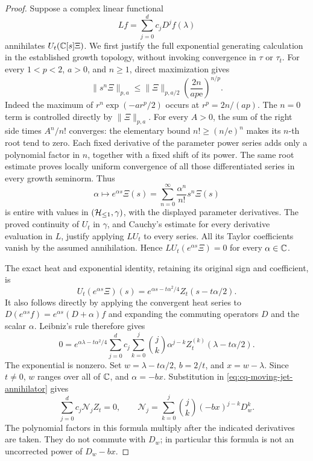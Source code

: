 \begin{proof}
Suppose a complex linear functional
\[
 Lf=\sum_{j=0}^d c_jD^jf(\lambda)
\]
annihilates $U_t(\mathbb C[s]\Xi)$. We first justify the full
exponential generating calculation in the established growth
topology, without invoking convergence in $\tau$ or $\tau_t$.
For every $1<p<2$, $a>0$, and $n\ge1$, direct maximization gives
\begin{equation}
 \|s^n\Xi\|_{p,a}
 \le\|\Xi\|_{p,a/2}
       \left(\frac{2n}{ap\mathrm e}\right)^{n/p}.
 \label{eq:cq-exponential-jet-convergence}
\end{equation}
Indeed the maximum of $r^n\exp(-ar^p/2)$ occurs at
$r^p=2n/(ap)$. The $n=0$ term is controlled directly by
$\|\Xi\|_{p,a}$. For every $A>0$, the sum of the right side
times $A^n/n!$ converges: the elementary bound
$n!\ge(n/\mathrm e)^n$ makes its $n$-th root tend to zero.
Each fixed derivative of the parameter power series adds only
a polynomial factor in $n$, together with a fixed shift of its
power. The same root estimate proves locally uniform convergence
of all those differentiated series in every growth seminorm.
Thus
\[
 \alpha\longmapsto e^{\alpha s}\Xi(s)
   =\sum_{n=0}^\infty\frac{\alpha^n}{n!}s^n\Xi(s)
\]
is entire with values in $(\mathcal H_{\leq 1},\gamma)$, with the displayed
parameter derivatives. The proved continuity of $U_t$ in
$\gamma$, and Cauchy's estimate for every derivative evaluation
in $L$, justify applying $LU_t$ to every series. All its Taylor
coefficients vanish by the assumed annihilation. Hence
$LU_t(e^{\alpha s}\Xi)=0$ for every $\alpha\in\mathbb C$.

The exact heat and exponential identity, retaining its original
sign and coefficient, is
\[
 U_t(e^{\alpha s}\Xi)(s)
  =e^{\alpha s-t\alpha^2/4}Z_t(s-t\alpha/2).
\]
It also follows directly by applying the convergent heat series
to $D(e^{\alpha s}f)=e^{\alpha s}(D+\alpha)f$ and expanding
the commuting operators $D$ and the scalar $\alpha$.
Leibniz's rule therefore gives
\begin{equation}
 0=e^{\alpha\lambda-t\alpha^2/4}
   \sum_{j=0}^d c_j\sum_{k=0}^j\binom jk
      \alpha^{j-k}Z_t^{(k)}(\lambda-t\alpha/2).
 \label{eq:cq-moving-jet-annihilator}
\end{equation}
The exponential is nonzero. Set $w=\lambda-t\alpha/2$,
$b=2/t$, and $x=w-\lambda$. Since $t\ne0$, $w$ ranges
over all of $\mathbb C$, and $\alpha=-bx$. Substitution in
\eqref{eq:cq-moving-jet-annihilator} gives
\begin{equation}
 \sum_{j=0}^d c_j\mathcal N_jZ_t=0,
 \qquad
 \mathcal N_j=\sum_{k=0}^j\binom jk(-bx)^{j-k}D_w^k.
 \label{eq:cq-moving-jet-normal-order}
\end{equation}
The polynomial factors in this formula multiply after the
indicated derivatives are taken. They do not commute with
$D_w$; in particular this formula is not an uncorrected
power of $D_w-bx$.


\end{proof}
